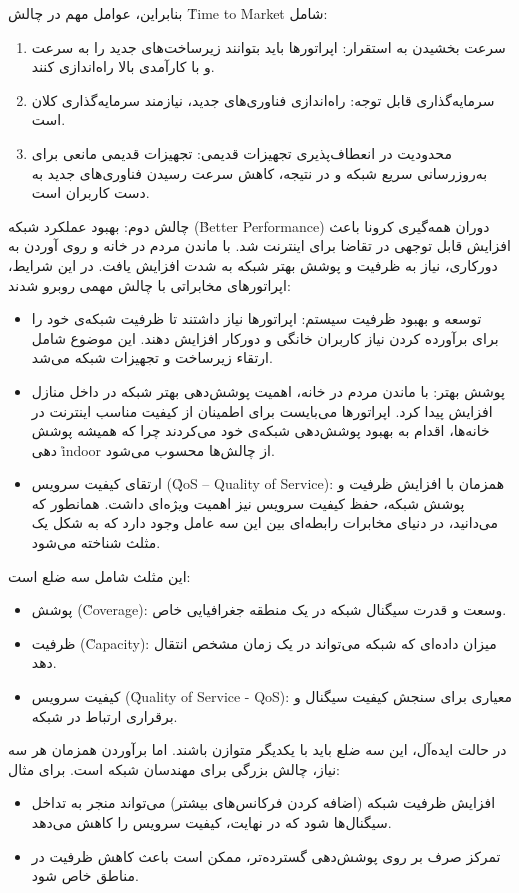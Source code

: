 \documentclass[landscape, 12pt]{report}
\begin{document}
بنابراین، عوامل مهم در چالش \r{Time to Market} شامل:
\begin{enumerate}
\item سرعت بخشیدن به استقرار: اپراتورها باید بتوانند زیرساخت‌های جدید را به سرعت و با کارآمدی بالا راه‌اندازی کنند.
\item سرمایه‌گذاری قابل توجه: راه‌اندازی فناوری‌های جدید، نیازمند سرمایه‌گذاری کلان است.
\item محدودیت در انعطاف‌پذیری تجهیزات قدیمی: تجهیزات قدیمی مانعی برای به‌روزرسانی سریع شبکه و در نتیجه، کاهش سرعت رسیدن فناوری‌های جدید به دست کاربران است.
\end{enumerate}

چالش دوم: بهبود عملکرد شبکه (\r{Better Performance}) 
دوران همه‌گیری کرونا باعث افزایش قابل توجهی در تقاضا برای اینترنت شد. با ماندن مردم در خانه و روی آوردن به دورکاری، نیاز به ظرفیت و پوشش بهتر شبکه به شدت افزایش یافت. در این شرایط، اپراتورهای مخابراتی با چالش مهمی روبرو شدند:
\begin{itemize}
\item توسعه و بهبود ظرفیت سیستم: اپراتورها نیاز داشتند تا ظرفیت شبکه‌ی خود را برای برآورده کردن نیاز کاربران خانگی و دورکار افزایش دهند. این موضوع شامل ارتقاء زیرساخت و تجهیزات شبکه می‌شد.
\item پوشش بهتر: با ماندن مردم در خانه، اهمیت پوشش‌دهی بهتر شبکه در داخل منازل افزایش پیدا کرد. اپراتورها می‌بایست برای اطمینان از کیفیت مناسب اینترنت در خانه‌ها، اقدام به بهبود پوشش‌دهی شبکه‌ی خود می‌کردند چرا که همیشه پوشش دهی \r{indoor} از چالش‌ها محسوب می‌شود.
\item ارتقای کیفیت سرویس (\r{QoS – Quality of Service}): همزمان با افزایش ظرفیت و پوشش شبکه، حفظ کیفیت سرویس نیز اهمیت ویژه‌ای داشت. همانطور که می‌دانید، در دنیای مخابرات رابطه‌ای بین این سه عامل وجود دارد که به شکل یک مثلث شناخته می‌شود.
\end{itemize}

این مثلث شامل سه ضلع است:
\begin{itemize}
\item پوشش (\r{Coverage}): وسعت و قدرت سیگنال شبکه در یک منطقه جغرافیایی خاص.
\item ظرفیت (\r{Capacity}): میزان داده‌ای که شبکه می‌تواند در یک زمان مشخص انتقال دهد.
\item کیفیت سرویس (\r{Quality of Service - QoS}): معیاری برای سنجش کیفیت سیگنال و برقراری ارتباط در شبکه.
\end{itemize}

در حالت ایده‌آل، این سه ضلع باید با یکدیگر متوازن باشند. اما برآوردن همزمان هر سه نیاز، چالش بزرگی برای مهندسان شبکه است. برای مثال:
\begin{itemize}
\item افزایش ظرفیت شبکه (اضافه کردن فرکانس‌های بیشتر) می‌تواند منجر به تداخل سیگنال‌ها شود که در نهایت، کیفیت سرویس را کاهش می‌دهد.
\item تمرکز صرف بر روی پوشش‌دهی گسترده‌تر، ممکن است باعث کاهش ظرفیت در مناطق خاص شود.
\end{itemize}
\end{document}
